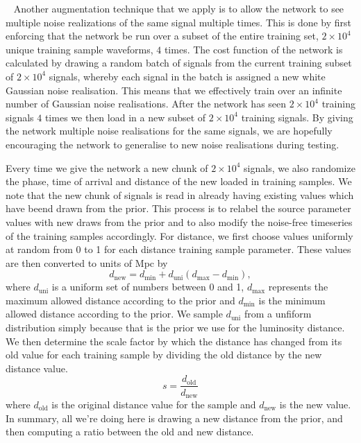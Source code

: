 ~ Another augmentation technique that we apply 
is to 
allow the network to see multiple noise realizations of the same 
signal multiple times. This is done by first enforcing that the network 
be run over a subset of the entire training set, $2\times10^4$ unique training 
sample waveforms, $4$ times. The cost function of the network 
is calculated by drawing a 
random batch of signals from the current training subset of $2\times10^4$
signals, whereby each signal in the batch  
is assigned a new white Gaussian 
noise realisation. This means that we effectively train over an infinite 
number of Gaussian noise realisations.
After the network has seen $2\times10^4$ training signals $4$ times we then 
load in a new subset of $2\times10^4$ training signals. By giving the network 
multiple noise realisations for the same signals, we are hopefully 
encouraging the network to generalise to new noise realisations 
during testing.

%
%
Every time we give the network a new chunk of $2\times10^4$ signals, 
we also randomize the phase, time of arrival and distance of the 
new loaded in training samples. We note that the new chunk of signals 
is read in already having existing values which have beend drawn from 
the prior. This process is to relabel the source parameter values with 
new draws from the prior and to also modify the noise-free timeseries 
of the training samples accordingly.
%
%
For distance, we first choose values uniformly at random from 0 to 1 for 
each distance training sample parameter. These values are then 
converted to units of Mpc by 
%
\begin{equation}\label{eq:dist_rescale}
    d_{\textrm{new}} = d_{\textrm{min}} + d_{\textrm{uni}} (d_{\textrm{max}} - d_{\textrm{min}}),
\end{equation}
%
where $d_{\textrm{uni}}$ is a uniform set of numbers between 0 and 1, 
$d_{\textrm{max}}$ represents the maximum allowed distance according to 
the prior and $d_{\textrm{min}}$ is the minimum allowed distance 
according to the prior. We sample $d_{\mathrm{uni}}$ from a unfiform 
distribution simply because that is the prior we use for the 
luminosity distance. We then determine the scale factor by which 
the distance has changed from its old value for each training 
sample by dividing the old distance by the new distance value.
%
\begin{equation}
    s = \frac{d_{\textrm{old}}}{d_{\textrm{new}}}
\end{equation}
%
where $d_{\textrm{old}}$ is the original distance value for the sample and $d_{\textrm{new}}$ is the new value. In summary, all we're doing here is drawing 
a new distance from the prior, and then computing a ratio between the old 
and new distance.

